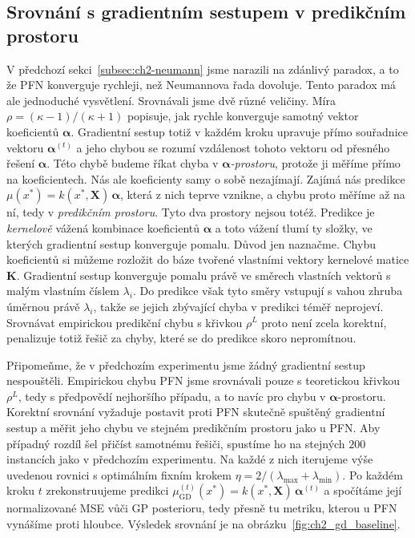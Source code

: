 \FloatBarrier

\subsection{Srovnání s gradientním sestupem v predikčním prostoru}
\label{subsec:ch2-gd}

V předchozí sekci~\ref{subsec:ch2-neumann} jsme narazili na zdánlivý paradox, a to že PFN konverguje rychleji, než Neumannova řada dovoluje.
Tento paradox má ale jednoduché vysvětlení.
Srovnávali jsme dvě různé veličiny.
Míra $\rho = (\kappa-1)/(\kappa+1)$ popisuje, jak rychle konverguje samotný vektor koeficientů $\boldsymbol{\alpha}$.
Gradientní sestup totiž v každém kroku upravuje přímo souřadnice vektoru $\boldsymbol{\alpha}^{(t)}$ a jeho chybou se rozumí vzdálenost tohoto vektoru od přesného řešení $\boldsymbol{\alpha}$.
Této chybě budeme říkat chyba v \textit{$\boldsymbol{\alpha}$-prostoru}, protože ji měříme přímo na koeficientech.
Nás ale koeficienty samy o sobě nezajímají.
Zajímá nás predikce $\mu(x^*) = k(x^*, \mathbf{X})\,\boldsymbol{\alpha}$, která z nich teprve vznikne, a chybu proto měříme až na ní, tedy v \textit{predikčním prostoru}.
Tyto dva prostory nejsou totéž.
Predikce je \emph{kernelově} vážená kombinace koeficientů $\boldsymbol{\alpha}$ a toto vážení tlumí ty složky, ve kterých gradientní sestup konverguje pomalu.
Důvod jen naznačme.
Chybu koeficientů si můžeme rozložit do báze tvořené vlastními vektory kernelové matice $\mathbf{K}$.
Gradientní sestup konverguje pomalu právě ve směrech vlastních vektorů s malým vlastním číslem $\lambda_i$.
Do predikce však tyto směry vstupují s vahou zhruba úměrnou právě $\lambda_i$, takže se jejich zbývající chyba v predikci téměř neprojeví.
Srovnávat empirickou predikční chybu s křivkou $\rho^L$ proto není zcela korektní, penalizuje totiž řešič za chyby, které se do predikce skoro nepromítnou.
\par

Připomeňme, že v předchozím experimentu jsme žádný gradientní sestup nespouštěli.
Empirickou chybu PFN jsme srovnávali pouze s teoretickou křivkou $\rho^L$, tedy s předpovědí nejhoršího případu, a to navíc pro chybu v $\boldsymbol{\alpha}$-prostoru.
Korektní srovnání vyžaduje postavit proti PFN skutečně spuštěný gradientní sestup a měřit jeho chybu ve stejném predikčním prostoru jako u PFN.
Aby případný rozdíl šel přičíst samotnému řešiči, spustíme ho na stejných $200$ instancích jako v předchozím experimentu.
Na každé z nich iterujeme výše uvedenou rovnici s optimálním fixním krokem $\eta = 2/(\lambda_{\max} + \lambda_{\min})$.
Po každém kroku $t$ zrekonstruujeme predikci $\mu_{\text{GD}}^{(t)}(x^*) = k(x^*, \mathbf{X})\,\boldsymbol{\alpha}^{(t)}$ a spočítáme její normalizované MSE vůči GP posterioru, tedy přesně tu metriku, kterou u PFN vynášíme proti hloubce.
Výsledek srovnání je na obrázku~\ref{fig:ch2_gd_baseline}.
\par

